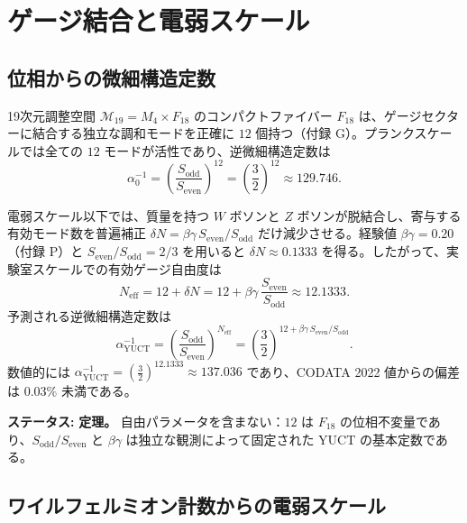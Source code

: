 \documentclass[12pt,a4paper]{article}
\begin{document}
	\section{ゲージ結合と電弱スケール}
	\label{sec:gauge}
	
	\subsection{位相からの微細構造定数}
	
	19次元調整空間 \(\mathcal{M}_{19}=M_4\times F_{18}\) のコンパクトファイバー \(F_{18}\) は、ゲージセクターに結合する独立な調和モードを正確に \(12\) 個持つ（付録 G）。プランクスケールでは全ての \(12\) モードが活性であり、逆微細構造定数は
	\begin{equation}
		\alpha_0^{-1} = \left(\frac{S_{\mathrm{odd}}}{S_{\mathrm{even}}}\right)^{12}
		= \left(\frac{3}{2}\right)^{12} \approx 129.746 .
	\end{equation}
	
	電弱スケール以下では、質量を持つ \(W\) ボソンと \(Z\) ボソンが脱結合し、寄与する有効モード数を普遍補正 \(\delta N = \beta\gamma \, S_{\mathrm{even}}/S_{\mathrm{odd}}\) だけ減少させる。経験値 \(\beta\gamma = 0.20\)（付録 P）と \(S_{\mathrm{even}}/S_{\mathrm{odd}} = 2/3\) を用いると \(\delta N \approx 0.1333\) を得る。したがって、実験室スケールでの有効ゲージ自由度は
	\begin{equation}
		N_{\mathrm{eff}} = 12 + \delta N = 12 + \beta\gamma\,\frac{S_{\mathrm{even}}}{S_{\mathrm{odd}}} \approx 12.1333 .
	\end{equation}
	予測される逆微細構造定数は
	\begin{equation}
		\boxed{\alpha^{-1}_{\mathrm{YUCT}} =
			\left(\frac{S_{\mathrm{odd}}}{S_{\mathrm{even}}}\right)^{N_{\mathrm{eff}}}
			= \left(\frac{3}{2}\right)^{12 + \beta\gamma\,S_{\mathrm{even}}/S_{\mathrm{odd}}} } .
		\label{eq:alpha-yuct}
	\end{equation}
	数値的には \(\alpha^{-1}_{\mathrm{YUCT}} = \left(\frac{3}{2}\right)^{12.1333} \approx 137.036\) であり、CODATA 2022 値からの偏差は \(0.03\%\) 未満である。
	
	\textbf{ステータス:} \textbf{定理。} 自由パラメータを含まない：\(12\) は \(F_{18}\) の位相不変量であり、\(S_{\mathrm{odd}}/S_{\mathrm{even}}\) と \(\beta\gamma\) は独立な観測によって固定された YUCT の基本定数である。
	
	\subsection{ワイルフェルミオン計数からの電弱スケール}
	
\end{document}
